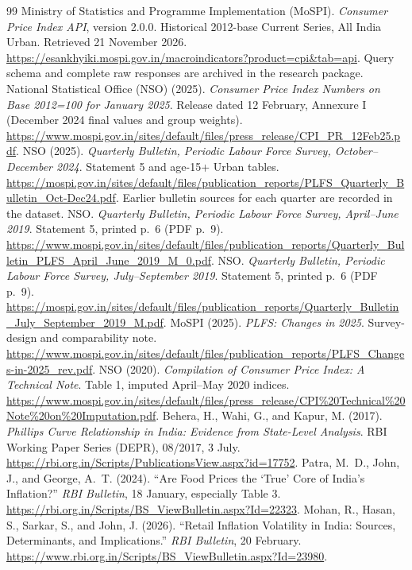 \documentclass[10pt,a4paper]{article}
\begin{document}
\clearpage
\begin{thebibliography}{99}\small
\setlength{\itemsep}{6pt}
 Ministry of Statistics and Programme Implementation (MoSPI). \emph{Consumer Price Index API}, version 2.0.0. Historical 2012-base Current Series, All India Urban. Retrieved 21 November 2026. \url{https://esankhyiki.mospi.gov.in/macroindicators?product=cpi&tab=api}. Query schema and complete raw responses are archived in the research package.
 National Statistical Office (NSO) (2025). \emph{Consumer Price Index Numbers on Base 2012=100 for January 2025}. Release dated 12 February, Annexure I (December 2024 final values and group weights). \url{https://www.mospi.gov.in/sites/default/files/press_release/CPI_PR_12Feb25.pdf}.
 NSO (2025). \emph{Quarterly Bulletin, Periodic Labour Force Survey, October--December 2024}. Statement 5 and age-15+ Urban tables. \url{https://mospi.gov.in/sites/default/files/publication_reports/PLFS_Quarterly_Bulletin_Oct-Dec24.pdf}. Earlier bulletin sources for each quarter are recorded in the dataset.
 NSO. \emph{Quarterly Bulletin, Periodic Labour Force Survey, April--June 2019}. Statement 5, printed p.~6 (PDF p.~9). \url{https://www.mospi.gov.in/sites/default/files/publication_reports/Quarterly_Bulletin_PLFS_April_June_2019_M_0.pdf}.
 NSO. \emph{Quarterly Bulletin, Periodic Labour Force Survey, July--September 2019}. Statement 5, printed p.~6 (PDF p.~9). \url{https://mospi.gov.in/sites/default/files/publication_reports/Quarterly_Bulletin_July_September_2019_M.pdf}.
 MoSPI (2025). \emph{PLFS: Changes in 2025}. Survey-design and comparability note. \url{https://www.mospi.gov.in/sites/default/files/publication_reports/PLFS_Changes-in-2025_rev.pdf}.
 NSO (2020). \emph{Compilation of Consumer Price Index: A Technical Note}. Table 1, imputed April--May 2020 indices. \url{https://www.mospi.gov.in/sites/default/files/press_release/CPI%20Technical%20Note%20on%20Imputation.pdf}.
 Behera, H., Wahi, G., and Kapur, M. (2017). \emph{Phillips Curve Relationship in India: Evidence from State-Level Analysis}. RBI Working Paper Series (DEPR), 08/2017, 3 July. \url{https://rbi.org.in/Scripts/PublicationsView.aspx?id=17752}.
 Patra, M.~D., John, J., and George, A.~T. (2024). ``Are Food Prices the `True' Core of India's Inflation?'' \emph{RBI Bulletin}, 18 January, especially Table 3. \url{https://rbi.org.in/Scripts/BS_ViewBulletin.aspx?Id=22323}.
 Mohan, R., Hasan, S., Sarkar, S., and John, J. (2026). ``Retail Inflation Volatility in India: Sources, Determinants, and Implications.'' \emph{RBI Bulletin}, 20 February. \url{https://www.rbi.org.in/Scripts/BS_ViewBulletin.aspx?Id=23980}.
\end{thebibliography}
\clearpage
\appendix
\end{document}
